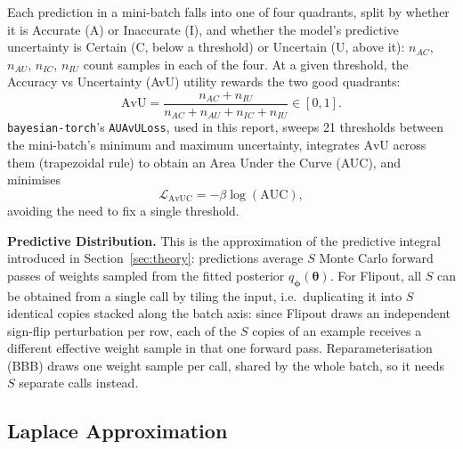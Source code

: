 \documentclass[conference]{IEEEtran}
\newcommand{\btheta}{\bm{\theta}}
\begin{document}
Each prediction in a mini-batch falls into one of four quadrants, split by whether it is
Accurate (A) or Inaccurate (I), and whether the model's predictive uncertainty is Certain
(C, below a threshold) or Uncertain (U, above it): $n_{AC}$, $n_{AU}$, $n_{IC}$, $n_{IU}$
count samples in each of the four. At a given threshold, the Accuracy vs Uncertainty (AvU)
utility rewards the two
good quadrants:
\begin{equation}
	\mathrm{AvU} = \frac{n_{AC}+n_{IU}}{n_{AC}+n_{AU}+n_{IC}+n_{IU}} \in [0,1].
	\label{eq:avu}
\end{equation}
\texttt{bayesian-torch}'s \texttt{AUAvULoss}, used in this report, sweeps 21 thresholds
between the mini-batch's minimum and maximum uncertainty, integrates $\mathrm{AvU}$ across
them (trapezoidal rule) to obtain an Area Under the Curve (AUC), and minimises
\begin{equation}
	\mathcal{L}_{\mathrm{AvUC}} = -\beta \log(\mathrm{AUC}),
	\label{eq:avuc}
\end{equation}
avoiding the need to fix a single threshold.

\textbf{Predictive Distribution.} This is the approximation of the predictive integral
introduced in Section~\ref{sec:theory}: predictions average $S$ Monte Carlo forward passes
of weights sampled from the fitted posterior $q_{\bm\phi}(\btheta)$. For Flipout, all $S$
can be obtained from a single call by tiling the input, i.e.\ duplicating it into $S$
identical copies stacked along the batch axis: since Flipout draws an independent sign-flip
perturbation per row, each of the $S$ copies of an example receives a different effective
weight sample in that one forward pass. Reparameterisation (BBB) draws one weight sample per
call, shared by the whole batch, so it needs $S$ separate calls instead.

\subsection{Laplace Approximation}
\label{sec:theory:la}
\end{document}
